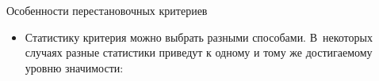 \documentclass[9pt,pdf,utf8,hyperref={unicode},aspectratio=169]{beamer}
\begin{document}
\begin{frame}{Особенности перестановочных критериев}
 \begin{itemize}
 \item Статистику критерия можно выбрать разными способами. В~некоторых случаях разные статистики приведут к одному и тому же достигаемому уровню значимости:

\end{itemize}
\end{frame}
\end{document}
